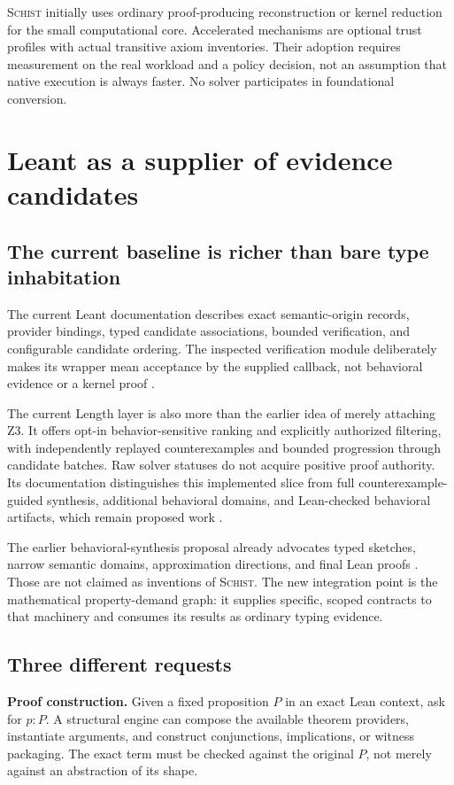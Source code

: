 \documentclass[11pt,a4paper]{article}
\newcommand{\code}[1]{\texttt{\detokenize{#1}}}
\newcommand{\Schist}{\textsc{Schist}}
\theoremstyle{definition}
\begin{document}
\Schist{} initially uses ordinary proof-producing reconstruction or kernel
reduction for the small computational core. Accelerated mechanisms are optional
trust profiles with actual transitive axiom inventories. Their adoption requires
measurement on the real workload and a policy decision, not an assumption that
native execution is always faster. No solver participates in foundational
conversion.

\section{Leant as a supplier of evidence candidates}\label{sec:leant}
\subsection{The current baseline is richer than bare type inhabitation}
The current Leant documentation describes exact semantic-origin records,
provider bindings, typed candidate associations, bounded verification, and
configurable candidate ordering. The inspected verification module deliberately
makes its \code{Verified} wrapper mean acceptance by the supplied callback,
not behavioral evidence or a kernel proof \cite{leantinternals,leantverification}.

The current Length layer is also more than the earlier idea of merely attaching
Z3. It offers opt-in behavior-sensitive ranking and explicitly authorized
filtering, with independently replayed counterexamples and bounded progression
through candidate batches. Raw solver statuses do not acquire positive proof
authority. Its documentation distinguishes this implemented slice from full
counterexample-guided synthesis, additional behavioral domains, and Lean-checked
behavioral artifacts, which remain proposed work \cite{leantlength}.

The earlier behavioral-synthesis proposal already advocates typed sketches,
narrow semantic domains, approximation directions, and final Lean proofs
\cite{leantz3}. Those are not claimed as inventions of \Schist{}. The new
integration point is the mathematical property-demand graph: it supplies
specific, scoped contracts to that machinery and consumes its results as
ordinary typing evidence.

\subsection{Three different requests}
\textbf{Proof construction.} Given a fixed proposition $P$ in an exact Lean
context, ask for $p:P$. A structural engine can compose the available theorem
providers, instantiate arguments, and construct conjunctions, implications,
or witness packaging. The exact term must be checked against the original
$P$, not merely against an abstraction of its shape.
\end{document}
